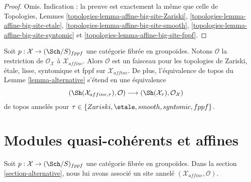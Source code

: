 \begin{proof}
Omis. Indication : la preuve est exactement la même que celle de
Topologies, Lemmes
\ref{topologies-lemma-affine-big-site-Zariski},
\ref{topologies-lemma-affine-big-site-etale},
\ref{topologies-lemma-affine-big-site-smooth},
\ref{topologies-lemma-affine-big-site-syntomic} et
\ref{topologies-lemma-affine-big-site-fppf}.
\end{proof}

\noindent
Soit $p : \mathcal{X} \to (\Sch/S)_{fppf}$ une catégorie fibrée en groupoïdes.
Notons $\mathcal{O}$ la restriction de $\mathcal{O}_\mathcal{X}$
à $\mathcal{X}_{affine}$. Alors $\mathcal{O}$ est un faisceau pour les topologies
de Zariski, \'etale, lisse, syntomique et fppf sur
$\mathcal{X}_{affine}$. De plus, l'équivalence de topos du
Lemme \ref{lemma-alternative} s'étend en une équivalence
\begin{equation}
\label{equation-alternative-ringed}
(\Sh(\mathcal{X}_{affine, \tau}), \mathcal{O})
\longrightarrow
(\Sh(\mathcal{X}_\tau), \mathcal{O}_\mathcal{X})
\end{equation}
de topos annelés pour $\tau \in \{Zariski, \etale, smooth, syntomic, fppf\}$.









\section{Modules quasi-cohérents et affines}
\label{section-alternative-quasi-coherent}

\noindent
Soit $p : \mathcal{X} \to (\Sch/S)_{fppf}$ une catégorie fibrée en groupoïdes.
Dans la section \ref{section-alternative}, nous lui avons associé un site annelé
$(\mathcal{X}_{affine}, \mathcal{O})$.


